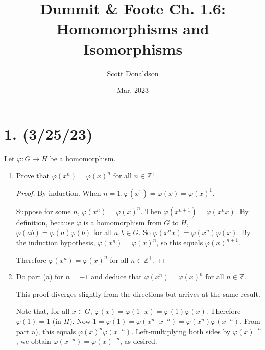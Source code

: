 \documentclass{article}
\title{Dummit \& Foote Ch. 1.6: Homomorphisms and Isomorphisms}
\author{Scott Donaldson}
\date{Mar. 2023}
\begin{document}
\maketitle

\section*{1. (3/25/23)}

Let $\varphi: G \rightarrow H$ be a homomorphism.

\begin{enumerate}[label=(\alph*)]
    \item Prove that $\varphi(x^n) = \varphi(x)^n$ for all $n \in \mathbb{Z}^+$.
          \begin{proof}
            By induction. When $n = 1, \varphi(x^1) = \varphi(x) = \varphi(x)^1$.

            Suppose for some $n$, $\varphi(x^n) = \varphi(x)^n$. Then $\varphi(x^{n + 1}) = \varphi(x^n x)$. By definition, because $\varphi$ is a homomorphism from $G$ to $H$, $\varphi(ab) = \varphi(a)\varphi(b)$ for all $a, b \in G$. So $\varphi(x^n x) = \varphi(x^n) \varphi(x)$. By the induction hypothesis, $\varphi(x^n) = \varphi(x)^n$, so this equals $\varphi(x)^{n + 1}$.

            Therefore $\varphi(x^n) = \varphi(x)^n$ for all $n \in \mathbb{Z}^+$.
          \end{proof}

    \item Do part (a) for $n = -1$ and deduce that $\varphi(x^n) = \varphi(x)^n$ for all $n \in \mathbb{Z}$.
    
          This proof diverges slightly from the directions but arrives at the same result.
          
          Note that, for all $x \in G$, $\varphi(x) = \varphi(1 \cdot x) = \varphi(1) \varphi(x)$. Therefore $\varphi(1) = 1$ (in $H$). Now $1 = \varphi(1) = \varphi(x^n \cdot x^{-n}) = \varphi(x^n) \varphi(x^{-n})$. From part a), this equals $\varphi(x)^n \varphi(x^{-n})$. Left-multiplying both sides by $\varphi(x)^{-n}$, we obtain $\varphi(x^{-n}) = \varphi(x)^{-n}$, as desired.
          
\end{enumerate}
\end{document}
